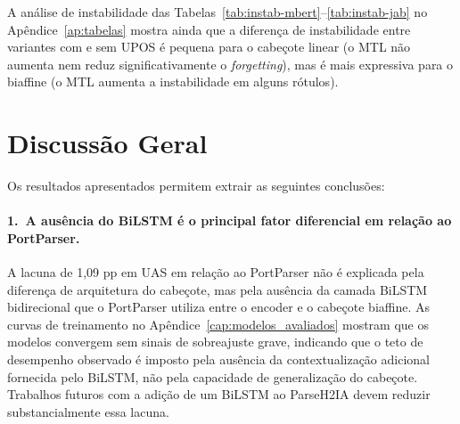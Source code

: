 A análise de instabilidade das Tabelas~\ref{tab:instab-mbert}--\ref{tab:instab-jab} no
Apêndice~\ref{ap:tabelas} mostra ainda que a diferença de instabilidade entre variantes com
e sem UPOS é pequena para o cabeçote linear (o MTL não aumenta nem reduz significativamente o
\textit{forgetting}), mas é mais expressiva para o biaffine (o MTL aumenta a instabilidade
em alguns rótulos).

\section{Discussão Geral}
\label{sec:discussao_geral}

Os resultados apresentados permitem extrair as seguintes conclusões:

\paragraph{1.\ A ausência do BiLSTM é o principal fator diferencial em relação ao PortParser.}
A lacuna de 1,09 pp em UAS em relação ao PortParser não é explicada pela diferença de
arquitetura do cabeçote, mas pela ausência da camada BiLSTM bidirecional que o PortParser
utiliza entre o encoder e o cabeçote biaffine. As curvas de treinamento no
Apêndice~\ref{cap:modelos_avaliados} mostram que os modelos convergem sem sinais de
sobreajuste grave, indicando que o teto de desempenho observado é imposto pela ausência da
contextualização adicional fornecida pelo BiLSTM, não pela capacidade de generalização do
cabeçote. Trabalhos futuros com a adição de um BiLSTM ao ParseH2IA devem reduzir
substancialmente essa lacuna.


